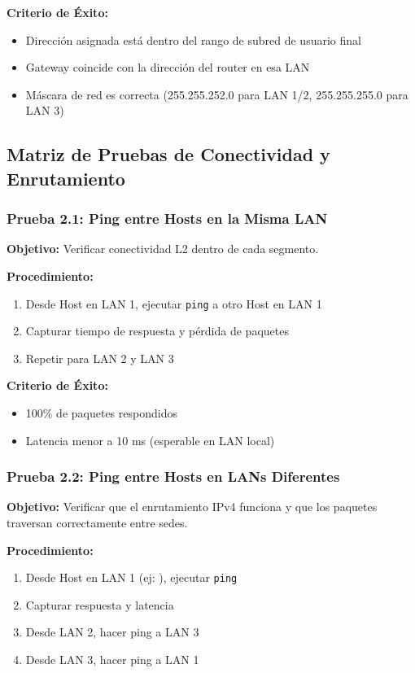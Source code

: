 \textbf{Criterio de Éxito:}
\begin{itemize}
\item Dirección asignada está dentro del rango de subred de usuario final
\item Gateway coincide con la dirección del router en esa LAN
\item Máscara de red es correcta (255.255.252.0 para LAN 1/2, 255.255.255.0 para LAN 3)
\end{itemize}


\subsection{Matriz de Pruebas de Conectividad y Enrutamiento}

\subsubsection{Prueba 2.1: Ping entre Hosts en la Misma LAN}

\textbf{Objetivo:} Verificar conectividad L2 dentro de cada segmento.

\textbf{Procedimiento:}
\begin{enumerate}
\item Desde Host en LAN 1, ejecutar \texttt{ping} a otro Host en LAN 1
\item Capturar tiempo de respuesta y pérdida de paquetes
\item Repetir para LAN 2 y LAN 3
\end{enumerate}

\textbf{Criterio de Éxito:}
\begin{itemize}
\item 100\% de paquetes respondidos
\item Latencia menor a 10 ms (esperable en LAN local)
\end{itemize}

\subsubsection{Prueba 2.2: Ping entre Hosts en LANs Diferentes}

\textbf{Objetivo:} Verificar que el enrutamiento IPv4 funciona y que los paquetes
traversan correctamente entre sedes.

\textbf{Procedimiento:}
\begin{enumerate}
\item Desde Host en LAN 1 (ej: \ipHostLanUno), ejecutar \texttt{ping \ipHostLanDos}
\item Capturar respuesta y latencia
\item Desde LAN 2, hacer ping a LAN 3
\item Desde LAN 3, hacer ping a LAN 1
\end{enumerate}

